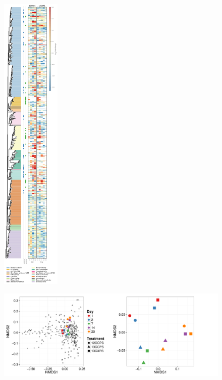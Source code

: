 \begin{figure}[H]
	\begin{center}
	\centerline{\includegraphics[width=0.25\textwidth]{figures/bacteria_tree/bacteria_tree.pdf}}
	\caption{\protect}\label{fig:trees}
        \end{center}
\end{figure}

\begin{figure}[H]
	\begin{center}
		\centerline{\includegraphics[width=\textwidth]{figures/bulk_ordination/bulk_ordination.pdf}}
	\caption{\protect}\label{fig:bulk_ord}
        \end{center}
\end{figure}

